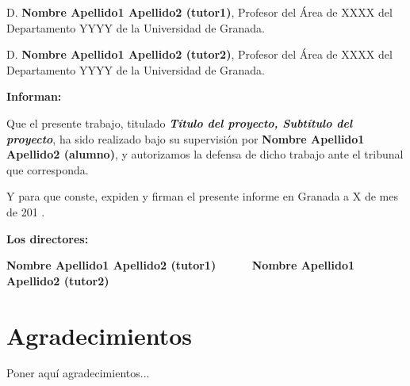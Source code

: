 D. \textbf{Nombre Apellido1 Apellido2 (tutor1)}, Profesor del Área de XXXX del Departamento YYYY de la Universidad de Granada.

\vspace{0.5cm}

D. \textbf{Nombre Apellido1 Apellido2 (tutor2)}, Profesor del Área de XXXX del Departamento YYYY de la Universidad de Granada.


\vspace{0.5cm}

\textbf{Informan:}

\vspace{0.5cm}

Que el presente trabajo, titulado \textit{\textbf{Título del proyecto, Subtítulo del proyecto}},
ha sido realizado bajo su supervisión por \textbf{Nombre Apellido1 Apellido2 (alumno)}, y autorizamos la defensa de dicho trabajo ante el tribunal
que corresponda.

\vspace{0.5cm}

Y para que conste, expiden y firman el presente informe en Granada a X de mes de 201 .

\vspace{1cm}

\textbf{Los directores:}

\vspace{5cm}

\noindent \textbf{Nombre Apellido1 Apellido2 (tutor1) \ \ \ \ \ Nombre Apellido1 Apellido2 (tutor2)}

\chapter*{Agradecimientos}
\thispagestyle{empty}

       \vspace{1cm}


Poner aquí agradecimientos...

